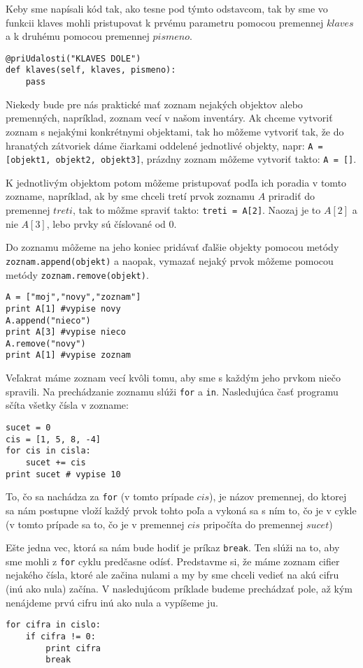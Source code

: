 Keby sme napísali kód tak, ako tesne pod týmto odstavcom, tak by sme vo funkcii klaves mohli
pristupovat k prvému parametru pomocou premennej $klaves$ a k druhému pomocou premennej $pismeno$.

\begin{lstlisting}
@priUdalosti("KLAVES DOLE")
def klaves(self, klaves, pismeno):
	pass
\end{lstlisting}


Niekedy bude pre nás praktické mať zoznam nejakých objektov alebo premenných, napríklad, zoznam
vecí v našom inventáry. Ak chceme vytvoriť zoznam s nejakými konkrétnymi objektami, tak ho môžeme
vytvoriť tak, že do hranatých zátvoriek dáme čiarkami oddelené jednotlivé objekty, napr: \texttt{A =
[objekt1, objekt2, objekt3]}, prázdny zoznam môžeme vytvoriť takto: \texttt{A = []}.

K jednotlivým objektom potom môžeme pristupovať podľa ich poradia v tomto zozname, napríklad, ak by
sme chceli tretí prvok zoznamu $A$ priradiť do premennej $treti$, tak to môžme spraviť takto:
\texttt{treti = A[2]}. Naozaj je to $A[2]$ a nie $A[3]$, lebo prvky sú číslované od $0$.

Do zoznamu môžeme na jeho koniec pridávať ďalšie objekty pomocou metódy \texttt{zoznam.append(objekt)} a
naopak, vymazať nejaký prvok môžeme pomocou metódy \texttt{zoznam.remove(objekt)}.

\begin{lstlisting}
A = ["moj","novy","zoznam"]
print A[1] #vypise novy
A.append("nieco")
print A[3] #vypise nieco
A.remove("novy")
print A[1] #vypise zoznam 
\end{lstlisting}

Veľakrat máme zoznam vecí kvôli tomu, aby sme s každým jeho prvkom niečo spravili. Na prechádzanie
zoznamu slúži \texttt{for} a \texttt{in}. Nasledujúca časť programu sčíta všetky čísla v zozname:

\begin{lstlisting}
sucet = 0
cis = [1, 5, 8, -4]
for cis in cisla:
	sucet += cis
print sucet # vypise 10
\end{lstlisting}

To, čo sa nachádza za \texttt{for} (v tomto prípade $cis$), je názov premennej, do ktorej sa nám postupne vloží
každý prvok tohto poľa a vykoná sa s ním to, čo je v cykle (v tomto prípade sa to, čo je v premennej
$cis$ pripočíta do premennej $sucet$)

Ešte jedna vec, ktorá sa nám bude hodiť je príkaz \texttt{break}. Ten slúži na to, aby sme mohli z
\texttt{for} cyklu predčasne odísť. Predstavme si, že máme zoznam cifier nejakého čísla, ktoré ale začina
nulami a my by sme chceli vedieť na akú cifru (inú ako nula) začína. V nasledujúcom príklade budeme
prechádzať pole, až kým nenájdeme prvú cifru inú ako nula a vypíšeme ju.

\begin{lstlisting}
for cifra in cislo:
	if cifra != 0:
		print cifra
		break
\end{lstlisting}



